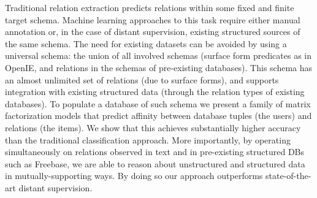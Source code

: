 Traditional relation extraction predicts relations within some fixed and finite target schema. Machine learning approaches to this task require either manual
 annotation or, in the case of distant supervision, existing structured sources
 of the same schema. The need for existing datasets can be avoided by using a
 universal schema: the union of all involved schemas (surface form predicates as
 in OpenIE, and relations in the schemas of pre-existing databases). This schema
 has an almost unlimited set of relations (due to surface forms), and supports
 integration with existing structured data (through the relation types of
 existing databases). To populate a database of such schema we present a family
 of matrix factorization models that predict affinity between database tuples
 (the users) and relations (the items). We show that this achieves substantially
 higher accuracy than the traditional classification approach. More importantly,
 by operating simultaneously on relations observed in text and in pre-existing
 structured DBs such as Freebase, we are able to reason about unstructured and
 structured data in mutually-supporting ways. By doing so our approach
 outperforms state-of-the-art distant supervision.

